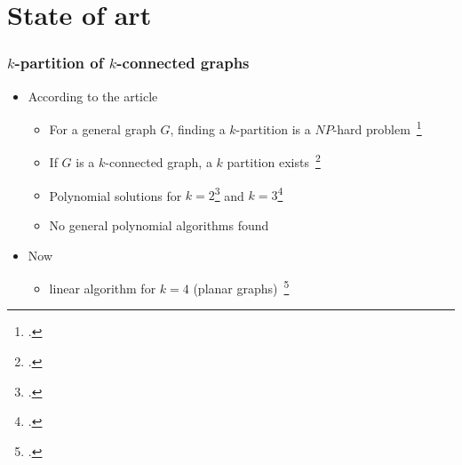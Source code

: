 \section{State of art}
%


\begin{frame}
  \frametitle{$k$-partition of $k$-connected graphs}
  \begin{itemize}
  \item According to the article
    \begin{itemize}
    \item For a general graph $G$, finding a $k$-partition is a $NP$-hard
      problem~\footcite{BF06}%
    \item If $G$ is a $k$-connected graph, a $k$ partition exists~\footcite{GE78,LL77}
    \item Polynomial solutions for $k = 2$\footcite{Suzuki1990227} and $k = 3$\footcite{Wada1994}
    \item No general polynomial algorithms found
    \end{itemize}
  \item Now
    \begin{itemize}
    \item linear algorithm for $k = 4$ (planar graphs)~\footcite{Nakano1997315}
    \end{itemize}
  \end{itemize}
\end{frame}

